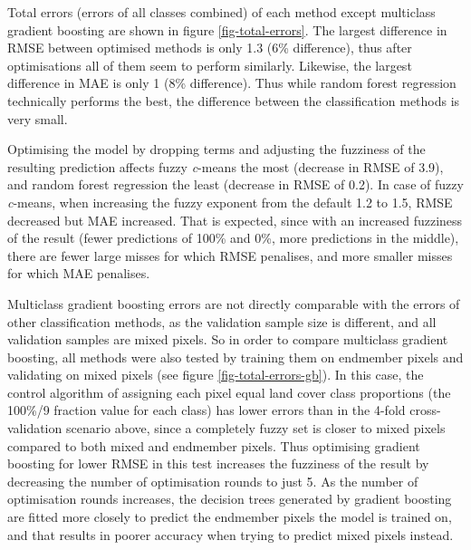 \documentclass[a4paper,10pt]{book}
\begin{document}
Total errors (errors of all classes combined) of each method except multiclass gradient boosting are shown in figure \ref{fig-total-errors}. The largest difference in RMSE between optimised methods is only 1.3 (6\% difference), thus after optimisations all of them seem to perform similarly. Likewise, the largest difference in MAE is only 1 (8\% difference). Thus while random forest regression technically performs the best, the difference between the classification methods is very small.

Optimising the model by dropping terms and adjusting the fuzziness of the resulting prediction affects fuzzy \textit{c}-means the most (decrease in RMSE of 3.9), and random forest regression the least (decrease in RMSE of 0.2). In case of fuzzy \textit{c}-means, when increasing the fuzzy exponent from the default 1.2 to 1.5, RMSE decreased but MAE increased. That is expected, since with an increased fuzziness of the result (fewer predictions of 100\% and 0\%, more predictions in the middle), there are fewer large misses for which RMSE penalises, and more smaller misses for which MAE penalises.

Multiclass gradient boosting errors are not directly comparable with the errors of other classification methods, as the validation sample size is different, and all validation samples are mixed pixels. So in order to compare multiclass gradient boosting, all methods were also tested by training them on endmember pixels and validating on mixed pixels (see figure \ref{fig-total-errors-gb}). In this case, the control algorithm of assigning each pixel equal land cover class proportions (the 100\%/9 fraction value for each class) has lower errors than in the 4-fold cross-validation scenario above, since a completely fuzzy set is closer to mixed pixels compared to both mixed and endmember pixels. Thus optimising gradient boosting for lower RMSE in this test increases the fuzziness of the result by decreasing the number of optimisation rounds to just 5. As the number of optimisation rounds increases, the decision trees generated by gradient boosting are fitted more closely to predict the endmember pixels the model is trained on, and that results in poorer accuracy when trying to predict mixed pixels instead.
\end{document}

